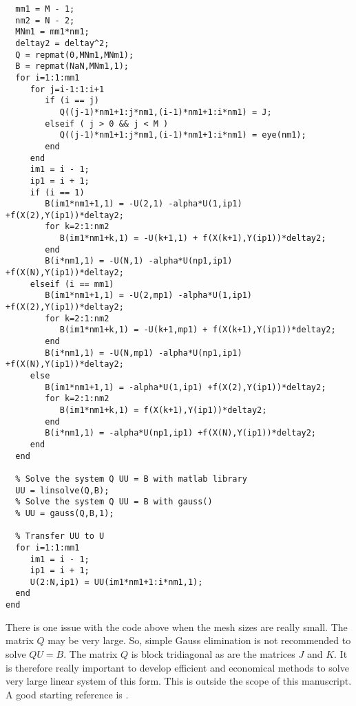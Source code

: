 \begin{code}
\begin{verbatim}
  mm1 = M - 1;
  nm2 = N - 2;
  MNm1 = mm1*nm1;
  deltay2 = deltay^2;
  Q = repmat(0,MNm1,MNm1);
  B = repmat(NaN,MNm1,1);
  for i=1:1:mm1
     for j=i-1:1:i+1
        if (i == j)
           Q((j-1)*nm1+1:j*nm1,(i-1)*nm1+1:i*nm1) = J; 
        elseif ( j > 0 && j < M )
           Q((j-1)*nm1+1:j*nm1,(i-1)*nm1+1:i*nm1) = eye(nm1);
        end
     end
     im1 = i - 1;
     ip1 = i + 1;
     if (i == 1)
        B(im1*nm1+1,1) = -U(2,1) -alpha*U(1,ip1) +f(X(2),Y(ip1))*deltay2;
        for k=2:1:nm2
           B(im1*nm1+k,1) = -U(k+1,1) + f(X(k+1),Y(ip1))*deltay2;
        end
        B(i*nm1,1) = -U(N,1) -alpha*U(np1,ip1) +f(X(N),Y(ip1))*deltay2;
     elseif (i == mm1)
        B(im1*nm1+1,1) = -U(2,mp1) -alpha*U(1,ip1) +f(X(2),Y(ip1))*deltay2;
        for k=2:1:nm2
           B(im1*nm1+k,1) = -U(k+1,mp1) + f(X(k+1),Y(ip1))*deltay2;
        end
        B(i*nm1,1) = -U(N,mp1) -alpha*U(np1,ip1) +f(X(N),Y(ip1))*deltay2;
     else
        B(im1*nm1+1,1) = -alpha*U(1,ip1) +f(X(2),Y(ip1))*deltay2;
        for k=2:1:nm2
           B(im1*nm1+k,1) = f(X(k+1),Y(ip1))*deltay2;
        end
        B(i*nm1,1) = -alpha*U(np1,ip1) +f(X(N),Y(ip1))*deltay2;
     end
  end

  % Solve the system Q UU = B with matlab library
  UU = linsolve(Q,B);
  % Solve the system Q UU = B with gauss()
  % UU = gauss(Q,B,1);

  % Transfer UU to U
  for i=1:1:mm1
     im1 = i - 1;
     ip1 = i + 1;
     U(2:N,ip1) = UU(im1*nm1+1:i*nm1,1);
  end
end
\end{verbatim}
\end{code}

\begin{rmk}
There is one issue with the code above when the mesh sizes are really
small.  The matrix $Q$ may be very large.  So, simple Gauss
elimination is not recommended to solve $Q U = B$.  The matrix $Q$ is
block tridiagonal as are the matrices $J$ and $K$.  It is therefore
really important to develop efficient and economical methods to solve
very large linear system of this form.  This is outside the scope of
this manuscript.  A good starting reference is \cite{GvL}.
\label{SpecialLinSyst}
\end{rmk}

